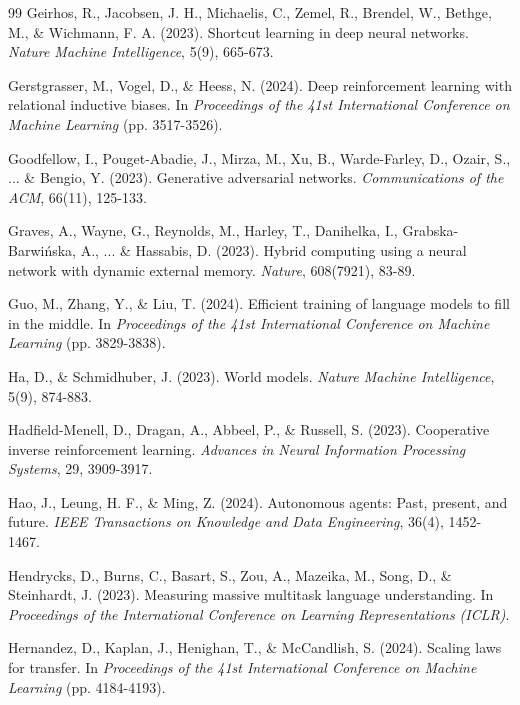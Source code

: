 \begin{thebibliography}{99}
Geirhos, R., Jacobsen, J. H., Michaelis, C., Zemel, R., Brendel, W., Bethge, M., \& Wichmann, F. A. (2023). Shortcut learning in deep neural networks. \textit{Nature Machine Intelligence}, 5(9), 665-673.

Gerstgrasser, M., Vogel, D., \& Heess, N. (2024). Deep reinforcement learning with relational inductive biases. In \textit{Proceedings of the 41st International Conference on Machine Learning} (pp. 3517-3526).

Goodfellow, I., Pouget-Abadie, J., Mirza, M., Xu, B., Warde-Farley, D., Ozair, S., ... \& Bengio, Y. (2023). Generative adversarial networks. \textit{Communications of the ACM}, 66(11), 125-133.

Graves, A., Wayne, G., Reynolds, M., Harley, T., Danihelka, I., Grabska-Barwińska, A., ... \& Hassabis, D. (2023). Hybrid computing using a neural network with dynamic external memory. \textit{Nature}, 608(7921), 83-89.

Guo, M., Zhang, Y., \& Liu, T. (2024). Efficient training of language models to fill in the middle. In \textit{Proceedings of the 41st International Conference on Machine Learning} (pp. 3829-3838).

Ha, D., \& Schmidhuber, J. (2023). World models. \textit{Nature Machine Intelligence}, 5(9), 874-883.

Hadfield-Menell, D., Dragan, A., Abbeel, P., \& Russell, S. (2023). Cooperative inverse reinforcement learning. \textit{Advances in Neural Information Processing Systems}, 29, 3909-3917.

Hao, J., Leung, H. F., \& Ming, Z. (2024). Autonomous agents: Past, present, and future. \textit{IEEE Transactions on Knowledge and Data Engineering}, 36(4), 1452-1467.

Hendrycks, D., Burns, C., Basart, S., Zou, A., Mazeika, M., Song, D., \& Steinhardt, J. (2023). Measuring massive multitask language understanding. In \textit{Proceedings of the International Conference on Learning Representations (ICLR)}.

Hernandez, D., Kaplan, J., Henighan, T., \& McCandlish, S. (2024). Scaling laws for transfer. In \textit{Proceedings of the 41st International Conference on Machine Learning} (pp. 4184-4193).


\end{thebibliography}

